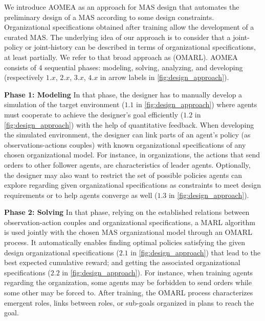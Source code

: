 We introduce AOMEA as an approach for MAS design that automates the preliminary design of a MAS according to some design constraints. Organizational specifications obtained after training allow the development of a curated MAS.
The underlying idea of our approach is to consider that a joint-policy or joint-history can be described in terms of organizational specifications, at least partially.
We refer to that broad approach as  (OMARL).
%
%
AOMEA consists of 4 sequential phases: modeling, solving, analyzing, and developing (respectively $1.x$, $2.x$, $3.x$, $4.x$ in arrow labels in \autoref{fig:design_approach}).

\textbf{Phase 1: Modeling} \quad In that phase, the designer has to manually develop a simulation of the target environment ($1.1$ in \autoref{fig:design_approach}) where agents must cooperate to achieve the designer's goal efficiently ($1.2$ in \autoref{fig:design_approach}) with the help of quantitative feedback. When developing the simulated environment, the designer can link parts of an agent's policy (as observations-actions couples) with known organizational specifications of any chosen organizational model.
For instance, in  organizations, the actions that send orders to other follower agents, are characteristics of leader agents.
Optionally, the designer may also want to restrict the set of possible policies agents can explore regarding given organizational specifications as constraints to meet design requirements or to help agents converge as well ($1.3$ in \autoref{fig:design_approach}).

\textbf{Phase 2: Solving} \quad In that phase, relying on the established relations between observation-action couples and organizational specifications, a MARL algorithm is used jointly with the chosen MAS organizational model through an OMARL process. It automatically enables finding optimal policies satisfying the given design organizational specifications ($2.1$ in \autoref{fig:design_approach}) that lead to the best expected cumulative reward; and getting the associated organizational specifications ($2.2$ in \autoref{fig:design_approach}). For instance, when training agents regarding the  organization, some agents may be forbidden to send orders while some other may be forced to. After training, the OMARL process characterizes emergent roles, links between roles, or sub-goals organized in plans to reach the goal.

